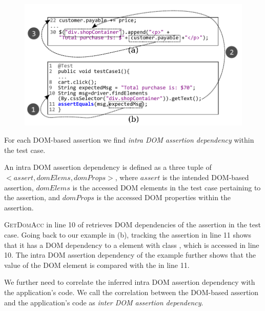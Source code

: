 \begin{figure}[!t]
  \centering
  \includegraphics[width=1\hsize]{fig/intraDOMDep}
   \vspace{-0.3in} 
  \label{Fig:assertionToCode}
  \vspace{-0.2in} 
\end{figure}
For each DOM-based assertion we find \emph{intra DOM assertion dependency} within the test case.
\begin{mydef}
\label{def:intraDOMDep}  

An intra DOM assertion dependency is defined as a three tuple of $<assert, domElems, domProps>$, where $assert$ is the intended DOM-based assertion, $domElems$ is the accessed DOM elements in the test case pertaining to the assertion, and $domProps$ is the accessed DOM properties within the assertion.
\end{mydef}
\textsc{GetDomAcc} in line 10 of  retrieves DOM dependencies of the assertion in the test case.
Going back to our example in (b), tracking the assertion in line 11 shows that it has a DOM dependency to a  element with class , which is accessed in line 10. The intra DOM assertion dependency of the example further shows that the  value of the DOM element is compared with the  in line 11.    

We further need to correlate the inferred intra DOM assertion dependency with the application's code.
We call the correlation between the DOM-based assertion and the application's code as \emph{inter DOM assertion dependency}.

